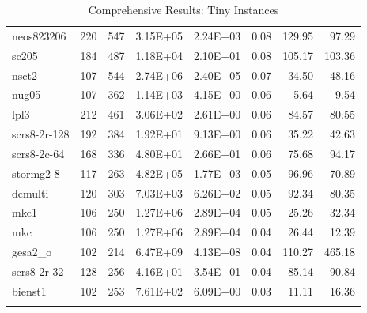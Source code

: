 \documentclass[10pt]{article}
\begin{document}
\begin{longtable}{|l|r|r|r|r|r|r|r|}
neos823206	&	220	&	547	&	3.15E+05	&	2.24E+03	&	0.08	&	129.95	&	97.29	\\
sc205	&	184	&	487	&	1.18E+04	&	2.10E+01	&	0.08	&	105.17	&	103.36	\\
nsct2	&	107	&	544	&	2.74E+06	&	2.40E+05	&	0.07	&	34.50	&	48.16	\\
nug05	&	107	&	362	&	1.14E+03	&	4.15E+00	&	0.06	&	5.64	&	9.54	\\
lpl3	&	212	&	461	&	3.06E+02	&	2.61E+00	&	0.06	&	84.57	&	80.55	\\
scrs8-2r-128	&	192	&	384	&	1.92E+01	&	9.13E+00	&	0.06	&	35.22	&	42.63	\\
scrs8-2c-64	&	168	&	336	&	4.80E+01	&	2.66E+01	&	0.06	&	75.68	&	94.17	\\
stormg2-8	&	117	&	263	&	4.82E+05	&	1.77E+03	&	0.05	&	96.96	&	70.89	\\
dcmulti	&	120	&	303	&	7.03E+03	&	6.26E+02	&	0.05	&	92.34	&	80.35	\\
mkc1	&	106	&	250	&	1.27E+06	&	2.89E+04	&	0.05	&	25.26	&	32.34	\\
mkc	&	106	&	250	&	1.27E+06	&	2.89E+04	&	0.04	&	26.44	&	12.39	\\
gesa2\_o	&	102	&	214	&	6.47E+09	&	4.13E+08	&	0.04	&	110.27	&	465.18	\\
scrs8-2r-32	&	128	&	256	&	4.16E+01	&	3.54E+01	&	0.04	&	85.14	&	90.84	\\
bienst1	&	102	&	253	&	7.61E+02	&	6.09E+00	&	0.03	&	11.11	&	16.36	\\
\hline
\caption{Comprehensive Results: Tiny Instances}
\small
\centering
\label{supptab:all_tiny}
\end{longtable}
\end{document}
